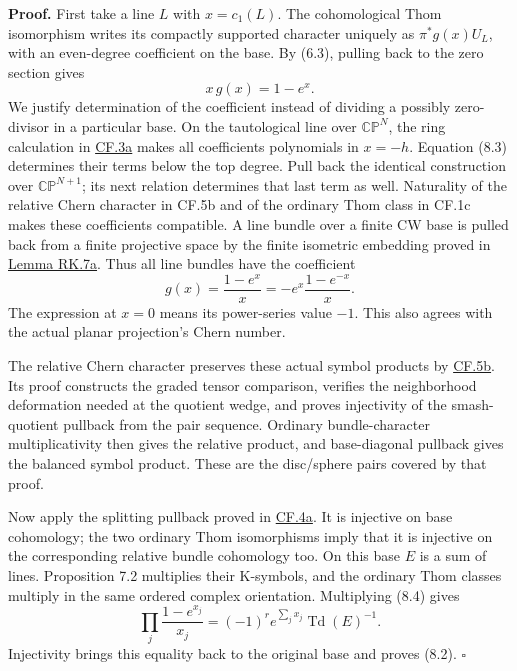 \documentclass[
  11pt,
]{article}
\begin{document}
\textbf{Proof.} First take a line \(L\) with \(x=c_1(L)\). The
cohomological Thom isomorphism writes its compactly supported character
uniquely as \(\pi^*g(x)U_L\), with an even-degree coefficient on the
base. By (6.3), pulling back to the zero section gives \[
x\,g(x)=1-e^x.
\tag{8.3}
\] We justify determination of the coefficient instead of dividing a
possibly zero-divisor in a particular base. On the tautological line
over \(\mathbb{CP}^N\), the ring calculation in
\href{supporting/cohomological-foundations/cohomological-foundations.html\#cf-projective-space}{CF.3a}
makes all coefficients polynomials in \(x=-h\). Equation (8.3)
determines their terms below the top degree. Pull back the identical
construction over \(\mathbb{CP}^{N+1}\); its next relation determines
that last term as well. Naturality of the relative Chern character in
CF.5b and of the ordinary Thom class in CF.1c makes these coefficients
compatible. A line bundle over a finite CW base is pulled back from a
finite projective space by the finite isometric embedding proved in
\href{supporting/relative-k-foundations/relative-k-foundations.html\#rk-line-classification}{Lemma
RK.7a}. Thus all line bundles have the coefficient \[
g(x)=\frac{1-e^x}{x}
 =-e^x\frac{1-e^{-x}}{x}.
\tag{8.4}
\] The expression at \(x=0\) means its power-series value \(-1\). This
also agrees with the actual planar projection's Chern number.

The relative Chern character preserves these actual symbol products by
\href{supporting/cohomological-foundations/cohomological-foundations.html\#cf-relative-character}{CF.5b}.
Its proof constructs the graded tensor comparison, verifies the
neighborhood deformation needed at the quotient wedge, and proves
injectivity of the smash-quotient pullback from the pair sequence.
Ordinary bundle-character multiplicativity then gives the relative
product, and base-diagonal pullback gives the balanced symbol product.
These are the disc/sphere pairs covered by that proof.

Now apply the splitting pullback proved in
\href{supporting/cohomological-foundations/cohomological-foundations.html\#cf-splitting}{CF.4a}.
It is injective on base cohomology; the two ordinary Thom isomorphisms
imply that it is injective on the corresponding relative bundle
cohomology too. On this base \(E\) is a sum of lines. Proposition 7.2
multiplies their K-symbols, and the ordinary Thom classes multiply in
the same ordered complex orientation. Multiplying (8.4) gives \[
\prod_j\frac{1-e^{x_j}}{x_j}
 =(-1)^r e^{\sum_jx_j}\operatorname{Td}(E)^{-1}.
\] Injectivity brings this equality back to the original base and proves
(8.2). \(\square\)
\end{document}

